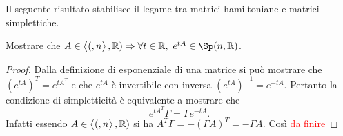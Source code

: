 Il seguente risultato stabilisce il legame tra matrici hamiltoniane e matrici simplettiche.

\begin{thm}
    Mostrare che $ A \in \sp(n, \R) \Rightarrow \forall t \in \R, \ e^{tA} \in \Sp(n, \R) $.
\end{thm}
\begin{proof}
    Dalla definizione di esponenziale di una matrice si può mostrare che $ (e^{tA})^T = e^{t A^T} $ e che $ e^{tA} $ è invertibile con inversa $ (e^{tA})^{-1} = e^{-tA} $. Pertanto la condizione di simpletticità è equivalente a mostrare che
    \[
        e^{tA^T} \Gamma = \Gamma e^{-tA}.
    \]
    Infatti essendo $ A \in \left\langle (, n \right\rangle, \mathbb{R}) $ si ha $ A^T\Gamma = -(\Gamma A)^T = - \Gamma A $. Così \textcolor{red}{da finire}
\end{proof}
